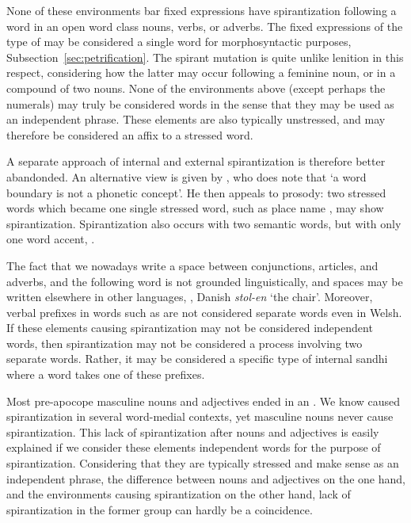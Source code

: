 None of these environments bar fixed expressions have spirantization following a word in an open word class \ie nouns, verbs, or adverbs.
The fixed expressions of the type of  may be considered a single word for morphosyntactic purposes, \cf Subsection~\ref{sec:petrification}.
The spirant mutation is quite unlike lenition in this respect, considering how the latter may occur \eg following a feminine noun, or in a compound of two nouns. None of the environments above (except perhaps the numerals) may truly be considered words in the sense that they may be used as an independent phrase.
These elements are also typically unstressed, and may therefore be considered an affix to a stressed word.

A separate approach of internal and external spirantization is therefore better abandonded. An alternative view is given by \textcite[126--129]{koch_neo-brittonic_1989}, who does note that `a word boundary is not a phonetic concept'.
He then appeals to prosody: two stressed words which became one single stressed word, such as place name , may show spirantization.
Spirantization also occurs with two semantic words, but with only one word accent, \eg {}.

The fact that we nowadays write a space between conjunctions, articles, and adverbs, \etc and the following word is not grounded linguistically, and spaces may be written elsewhere in other languages, \eg {}, Danish \textit{stol-en} `the chair'.
Moreover, verbal prefixes in words such as  are not considered separate words even in Welsh.
If  these elements causing spirantization may not be considered independent words, then spirantization may not be considered a process involving two separate words.
Rather, it may be considered a specific type of internal sandhi where a word takes one of these prefixes.

Most pre-apocope masculine  nouns and adjectives ended in an .
We know  caused spirantization in several word-medial contexts, yet masculine nouns never cause spirantization.
This lack of spirantization after nouns and adjectives is easily explained if we consider these elements independent words for the purpose of spirantization.
Considering that they are typically stressed and make sense as an independent phrase, the difference between nouns and adjectives on the one hand, and the environments causing spirantization on the other hand, lack of spirantization in the former group can hardly be a coincidence.

